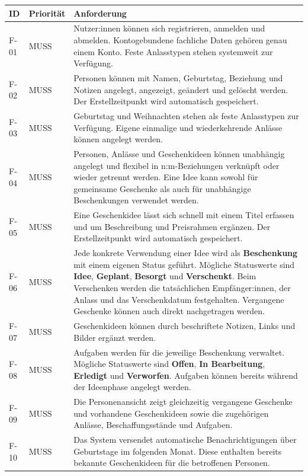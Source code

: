 \documentclass[11pt,a4paper]{article}
\begin{document}
\begin{tabularx}{\linewidth}{@{}l l Y@{}}
\toprule
\textbf{ID} & \textbf{Priorität} & \textbf{Anforderung} \\
\midrule
\endhead
F-01 & MUSS & Nutzer:innen können sich registrieren, anmelden und abmelden. Kontogebundene fachliche Daten gehören genau einem Konto. Feste Anlasstypen stehen systemweit zur Verfügung. \\
F-02 & MUSS & Personen können mit Namen, Geburtstag, Beziehung und Notizen angelegt, angezeigt, geändert und gelöscht werden. Der Erstellzeitpunkt wird automatisch gespeichert. \\
F-03 & MUSS & Geburtstag und Weihnachten stehen als feste Anlasstypen zur Verfügung. Eigene einmalige und wiederkehrende Anlässe können angelegt werden. \\
F-04 & MUSS & Personen, Anlässe und Geschenkideen können unabhängig angelegt und flexibel in n:m-Beziehungen verknüpft oder wieder getrennt werden. Eine Idee kann sowohl für gemeinsame Geschenke als auch für unabhängige Beschenkungen verwendet werden. \\
F-05 & MUSS & Eine Geschenkidee lässt sich schnell mit einem Titel erfassen und um Beschreibung und Preisrahmen ergänzen. Der Erstellzeitpunkt wird automatisch gespeichert. \\
F-06 & MUSS & Jede konkrete Verwendung einer Idee wird als \textbf{Beschenkung} mit einem eigenen Status geführt. Mögliche Statuswerte sind \textbf{Idee}, \textbf{Geplant}, \textbf{Besorgt} und \textbf{Verschenkt}. Beim Verschenken werden die tatsächlichen Empfänger:innen, der Anlass und das Verschenkdatum festgehalten. Vergangene Geschenke können auch direkt nachgetragen werden. \\
F-07 & MUSS & Geschenkideen können durch beschriftete Notizen, Links und Bilder ergänzt werden. \\
F-08 & MUSS & Aufgaben werden für die jeweilige Beschenkung verwaltet. Mögliche Statuswerte sind \textbf{Offen}, \textbf{In Bearbeitung}, \textbf{Erledigt} und \textbf{Verworfen}. Aufgaben können bereits während der Ideenphase angelegt werden. \\
F-09 & MUSS & Die Personenansicht zeigt gleichzeitig vergangene Geschenke und vorhandene Geschenkideen sowie die zugehörigen Anlässe, Beschaffungsstände und Aufgaben. \\
F-10 & MUSS & Das System versendet automatische Benachrichtigungen über Geburtstage im folgenden Monat. Diese enthalten bereits bekannte Geschenkideen für die betroffenen Personen. \\

\end{tabularx}
\end{document}
